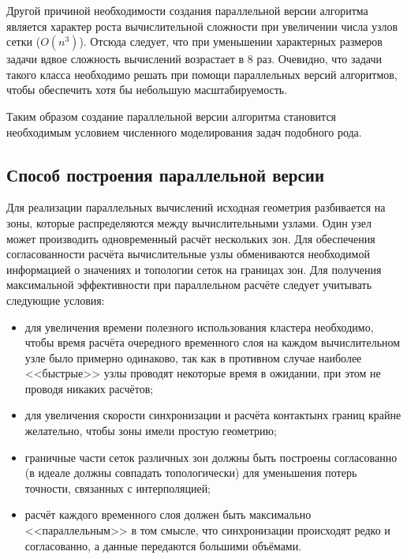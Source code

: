 Другой причиной необходимости создания параллельной версии алгоритма является характер роста вычислительной сложности при увеличении числа узлов сетки ($O(n^3)$). Отсюда следует, что при уменьшении характерных размеров задачи вдвое сложность вычислений возрастает в 8 раз. Очевидно, что задачи такого класса необходимо решать при помощи параллельных версий алгоритмов, чтобы обеспечить хотя бы небольшую масштабируемость.

Таким образом создание параллельной версии алгоритма становится необходимым условием численного моделирования задач подобного рода.

\subsection{Способ построения параллельной версии}
Для реализации параллельных вычислений исходная геометрия разбивается на зоны, которые распределяются между вычислительными узлами. Один узел может производить одновременный расчёт нескольких зон. Для обеспечения согласованности расчёта вычислительные узлы обмениваются необходимой информацией о значениях и топологии сеток на границах зон. Для получения максимальной эффективности при параллельном расчёте следует учитывать следующие условия:
\begin{itemize}
	\item для увеличения времени полезного использования кластера необходимо, чтобы время расчёта очередного временного слоя на каждом вычислительном узле было примерно одинаково, так как в противном случае наиболее <<быстрые>> узлы проводят некоторые время в ожидании, при этом не проводя никаких расчётов;
	\item для увеличения скорости синхронизации и расчёта контактынх границ крайне желательно, чтобы зоны имели простую геометрию;
	\item граничные части сеток различных зон должны быть построены согласованно (в идеале должны совпадать топологически) для уменьшения потерь точности, связанных с интерполяцией;
	\item расчёт каждого временного слоя должен быть максимально <<параллельным>> в том смысле, что синхронизации происходят редко и согласованно, а данные передаются большими объёмами.
\end{itemize}
